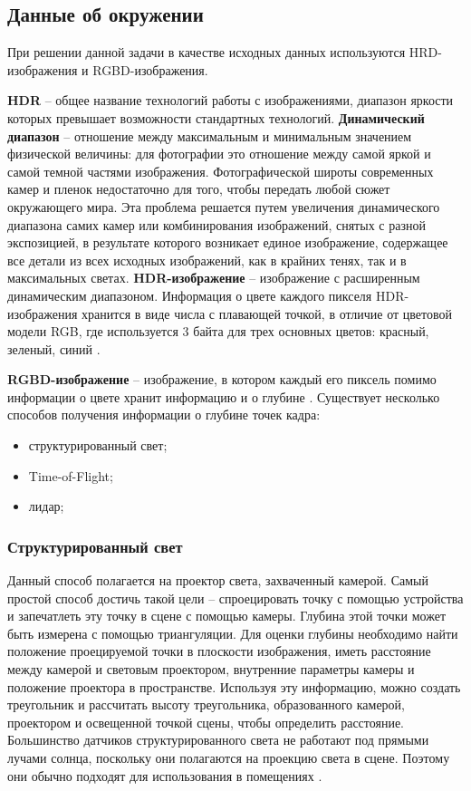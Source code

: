 \subsection{Данные об окружении}

При решении данной задачи в качестве исходных данных используются HRD-изображения и RGBD-изображения.

\textbf{HDR} -- общее название технологий работы с изображениями, диапазон яркости которых превышает возможности стандартных технологий. \textbf{Динамический диапазон} -- отношение между максимальным и минимальным значением физической величины: для фотографии это отношение между самой яркой и самой темной частями изображения. Фотографической широты современных камер и пленок недостаточно для того, чтобы передать любой сюжет окружающего мира. Эта проблема решается путем увеличения динамического диапазона самих камер или комбинирования изображений, снятых с разной экспозицией, в результате которого возникает единое изображение, содержащее все детали из всех исходных изображений, как в крайних тенях, так и в максимальных светах. \textbf{HDR-изображение} -- изображение с расширенным динамическим диапазоном. Информация о цвете каждого пикселя HDR-изображения хранится в виде числа с плавающей точкой, в отличие от цветовой модели RGB, где используется 3 байта для трех основных цветов: красный, зеленый, синий \cite{hdri}.

\textbf{RGBD-изображение} -- изображение, в котором каждый его пиксель помимо информации о цвете хранит информацию и о глубине \cite{rgbd}. Существует несколько способов получения информации о глубине точек кадра:

\begin{itemize}
	\item структурированный свет;
	\item Time-of-Flight;
	\item лидар;
\end{itemize}

\subsubsection*{Структурированный свет}

Данный способ полагается на проектор света, захваченный камерой. Самый простой способ достичь такой цели -- спроецировать точку с помощью устройства и запечатлеть эту точку в сцене с помощью камеры. Глубина этой точки может быть измерена с помощью триангуляции. Для оценки глубины необходимо найти положение проецируемой точки в плоскости изображения, иметь расстояние между камерой и световым проектором, внутренние параметры камеры и положение проектора в пространстве. Используя эту информацию, можно создать треугольник и рассчитать высоту треугольника, образованного камерой, проектором и освещенной точкой сцены, чтобы определить расстояние. Большинство датчиков структурированного света не работают под прямыми лучами солнца, поскольку они полагаются на проекцию света в сцене. Поэтому они обычно подходят для использования в помещениях \cite{rgbd}.

